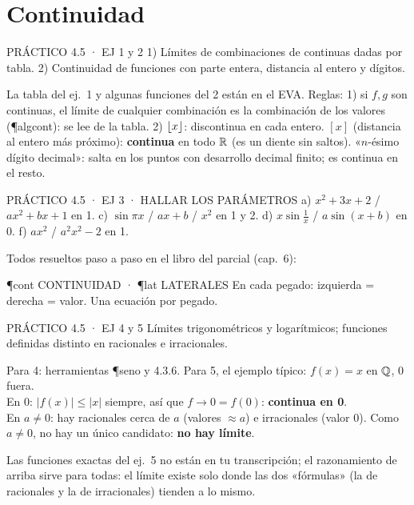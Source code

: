 \section{Continuidad}

\begin{enunciado}{PRÁCTICO 4.5 · EJ 1 y 2}
1) Límites de combinaciones de continuas dadas por tabla. 2) Continuidad de funciones con parte entera, distancia al entero y dígitos.
\end{enunciado}
\begin{falta}
La tabla del ej.\ 1 y algunas funciones del 2 están en el EVA. Reglas: 1) si $f,g$ son continuas, el límite de cualquier combinación es la combinación de los valores (\P{algcont}): se lee de la tabla. 2) $\lfloor x\rfloor$: discontinua en cada entero. $[x]$ (distancia al entero más próximo): \textbf{continua} en todo $\mathbb{R}$ (es un diente sin saltos). «$n$-ésimo dígito decimal»: salta en los puntos con desarrollo decimal finito; es continua en el resto.
\end{falta}

\begin{enunciado}{PRÁCTICO 4.5 · EJ 3 · HALLAR LOS PARÁMETROS}
a) $x^2+3x+2$ / $ax^2+bx+1$ en 1. c) $\sin\pi x$ / $ax+b$ / $x^2$ en 1 y 2. d) $x\sin\frac1x$ / $a\sin(x+b)$ en 0. f) $ax^2$ / $a^2x^2-2$ en 1.
\end{enunciado}
Todos resueltos paso a paso en el libro del parcial (cap.\ 6):
\begin{uso}{\P{cont} CONTINUIDAD · \P{lat} LATERALES}
En cada pegado: izquierda = derecha = valor. Una ecuación por pegado.
\end{uso}

\begin{enunciado}{PRÁCTICO 4.5 · EJ 4 y 5}
Límites trigonométricos y logarítmicos; funciones definidas distinto en racionales e irracionales.
\end{enunciado}
Para 4: herramientas \P{seno} y 4.3.6. Para 5, el ejemplo típico: $f(x)=x$ en $\mathbb{Q}$, $0$ fuera.\\
En $0$: $|f(x)|\le|x|$ siempre, así que $f\to0=f(0)$: \textbf{continua en 0}.\\
En $a\neq0$: hay racionales cerca de $a$ (valores $\approx a$) e irracionales (valor 0). Como $a\neq0$, no hay un único candidato: \textbf{no hay límite}.
\begin{falta}
Las funciones exactas del ej.\ 5 no están en tu transcripción; el razonamiento de arriba sirve para todas: el límite existe solo donde las dos «fórmulas» (la de racionales y la de irracionales) tienden a lo mismo.
\end{falta}

